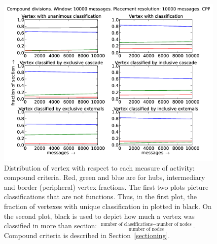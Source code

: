 \documentclass[%
 aip,
 jmp,%
 amsmath,amssymb,
 reprint,%
]{revtex4-1}
\begin{document}
\begin{figure}[hbtp] 
   \centering
        \includegraphics[width=\textwidth]{figs/CPP/10000_2}
    \caption{Distribution of vertex with respect to each measure of activity: compound criteria. Red, green and blue are for hubs, intermediary and border (peripheral) vertex fractions. The first two plots picture classifications that are not functions. Thus, in the first plot, the fraction of vertexes with unique classification in plotted in black. On the second plot, black is used to depict how much a vertex was classified in more than section: $\frac{\text{number of classifications} - \text{number of nodes}}{\text{number of nodes}}$. Compound criteria is described in Section~\ref{sectioning}.}
    \label{fig:cpp10000_}
\end{figure}
\end{document}
